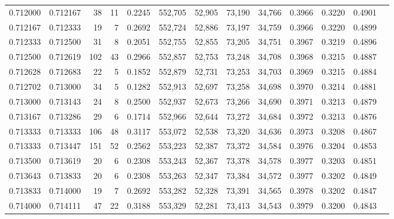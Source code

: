 \begin{tabular}{rrrrrrrrrrrrr}
0.712000 & 0.712167 &    38 &  11 &                                     0.2245 & 552,705 &  52,905 &  73,190 &  34,766 & 0.3966 & 0.3220 & 0.4901 \\
0.712167 & 0.712333 &    19 &   7 &                                     0.2692 & 552,724 &  52,886 &  73,197 &  34,759 & 0.3966 & 0.3220 & 0.4899 \\
0.712333 & 0.712500 &    31 &   8 &                                     0.2051 & 552,755 &  52,855 &  73,205 &  34,751 & 0.3967 & 0.3219 & 0.4896 \\
0.712500 & 0.712619 &   102 &  43 &                                     0.2966 & 552,857 &  52,753 &  73,248 &  34,708 & 0.3968 & 0.3215 & 0.4887 \\
0.712628 & 0.712683 &    22 &   5 &                                     0.1852 & 552,879 &  52,731 &  73,253 &  34,703 & 0.3969 & 0.3215 & 0.4884 \\
0.712702 & 0.713000 &    34 &   5 &                                     0.1282 & 552,913 &  52,697 &  73,258 &  34,698 & 0.3970 & 0.3214 & 0.4881 \\
0.713000 & 0.713143 &    24 &   8 &                                     0.2500 & 552,937 &  52,673 &  73,266 &  34,690 & 0.3971 & 0.3213 & 0.4879 \\
0.713167 & 0.713286 &    29 &   6 &                                     0.1714 & 552,966 &  52,644 &  73,272 &  34,684 & 0.3972 & 0.3213 & 0.4876 \\
0.713333 & 0.713333 &   106 &  48 &                                     0.3117 & 553,072 &  52,538 &  73,320 &  34,636 & 0.3973 & 0.3208 & 0.4867 \\
0.713333 & 0.713447 &   151 &  52 &                                     0.2562 & 553,223 &  52,387 &  73,372 &  34,584 & 0.3976 & 0.3204 & 0.4853 \\
0.713500 & 0.713619 &    20 &   6 &                                     0.2308 & 553,243 &  52,367 &  73,378 &  34,578 & 0.3977 & 0.3203 & 0.4851 \\
0.713643 & 0.713833 &    20 &   6 &                                     0.2308 & 553,263 &  52,347 &  73,384 &  34,572 & 0.3977 & 0.3202 & 0.4849 \\
0.713833 & 0.714000 &    19 &   7 &                                     0.2692 & 553,282 &  52,328 &  73,391 &  34,565 & 0.3978 & 0.3202 & 0.4847 \\
0.714000 & 0.714111 &    47 &  22 &                                     0.3188 & 553,329 &  52,281 &  73,413 &  34,543 & 0.3979 & 0.3200 & 0.4843 \\

\end{tabular}
